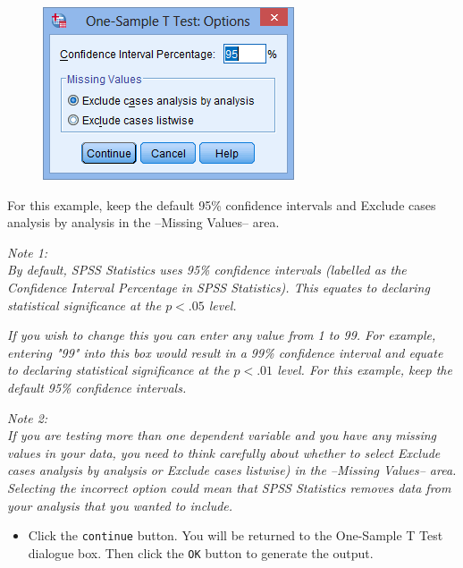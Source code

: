\documentclass[]{article}
\begin{document}
\begin{figure}[h!]
	\centering
	\includegraphics[width=0.5\linewidth]{OneSample/OneSample4}

	\label{fig:OneSample4}
\end{figure} \medskip
\noindent For this example, keep the default 95\% confidence intervals and Exclude cases analysis by analysis in the –Missing Values– area.
\newpage
\begin{framed}
\noindent \textit{Note 1:\\ By default, SPSS Statistics uses 95\% confidence intervals (labelled as the Confidence Interval Percentage in SPSS Statistics). This equates to declaring statistical significance at the $p < .05$ level. }
	
\textit{If you wish to change this you can enter any value from 1 to 99. For example, entering "99" into this box would result in a 99\% confidence interval and equate to declaring statistical significance at the $p < .01$ level. For this example, keep the default 95\% confidence intervals.}
\end{framed}
\begin{framed}
\noindent \textit{Note 2:\\ If you are testing more than one dependent variable and you have any missing values in your data, you need to think carefully about whether to select Exclude cases analysis by analysis or Exclude cases listwise) in the –Missing Values– area. Selecting the incorrect option could mean that SPSS Statistics removes data from your analysis that you wanted to include.}
\end{framed}

\begin{itemize}
	\item Click the \texttt{continue} button. You will be returned to the One-Sample T Test dialogue box. Then click the \texttt{OK} button to generate the output.
\end{itemize}
\end{document}
